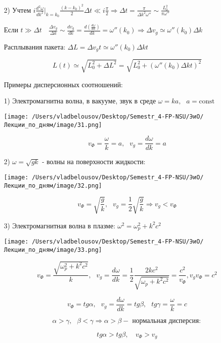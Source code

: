 \documentclass[12pt, a4paper]{report}
\begin{document}
2) Учтем \( \displaystyle i\frac{d ^2\omega }{dk ^2 } \bigg |_{k = k_0}  \frac{(k-k_0 ) ^2 }{2} \Delta t  \ll i \frac{\pi}{2 }  \Rightarrow \Delta t = \frac{\pi}{\Delta k ^2 \omega ''}\sim \frac{ L_0 ^2 }{ \pi \omega ''}        \) 

Если \( \displaystyle t \gg \Delta t    \quad  \frac{\Delta v_g }{\Delta k } \sim \frac{d v_g }{dk } = \frac{d \left( \frac{d \omega}{dk}  \right)}{dk}= \omega '' (k_0 ) \Rightarrow \Delta v_g \simeq \omega '' (k_0 )\Delta k       \) 

Расплывания пакета: \( \Delta L= \Delta v_g t \simeq \omega '' ( k_0 ) \Delta k t   \) 

\[ L(t  ) \simeq \sqrt{L_0 ^2 + \Delta L  ^2 } = \sqrt{ L_0 ^2 + ( \omega '' (k_0  )\Delta k t) ^2 }   \] 

Примеры дисперсионных соотношений: 

1) Электромагнитна волна, в вакууме, звук в среде \( \omega = k a , \text{ }  a = \mathrm{const}   \) 

\begin{center}
    \texttt{[image: /Users/vladbelousov/Desktop/Semestr\_4-FP-NSU/ЭиО/Лекции\_по\_дням/image/31.png]}
\end{center}

\[ v_{\Phi  } = \frac{\omega}{ k }  = a, \text{ }  v_g = \frac{ d \omega }{ d k}= a    \] 

2) \( \omega = \sqrt{gk } \) - волны на поверхности жидкости: 

\begin{center}
    \texttt{[image: /Users/vladbelousov/Desktop/Semestr\_4-FP-NSU/ЭиО/Лекции\_по\_дням/image/32.png]}
\end{center}

\[ v_{\Phi } = \sqrt{\frac{g}{k} }, \text{ }  v_g = \frac{1}{ 2} \sqrt{\frac{g}{k} } \Rightarrow v_g< v_{\Phi}     \] 

3) Электромагнитная волна в плазме: \( \omega ^2 = \omega_p ^2 + k ^2 c ^2  \) 

\begin{center}
    \texttt{[image: /Users/vladbelousov/Desktop/Semestr\_4-FP-NSU/ЭиО/Лекции\_по\_дням/image/33.png]}
\end{center}

\[ v_{\Phi }  = \frac{\sqrt{ \omega_p ^2 + k ^2  c ^2 }}{k }, \text{ }  v_g = \frac{d \omega }{dk } =\frac{1}{2 }  \frac{2 k c ^2 }{\sqrt{ \omega_p + k ^2 c ^2 }} = \frac{ c ^2 }{v_{\Phi} } , v_g v_{\Phi }  = c ^2   \] 

\[ v_{\Phi } = tg \alpha, \text{ }  v_g = \frac{d \omega } {dk } = tg \beta , \text{ }  tg \gamma = \frac{\omega}{k }  = c   \] 

\[ \alpha > \gamma , \text{ }  \beta < \gamma \Rightarrow \alpha  > \beta - \text{ нормальная дисперсия}  :  \] 

\[ tg \alpha > tg \beta ,\quad v_{\Phi }> v_g  \] 






\ifdefined\mainfile
\else
    
\end{document}
